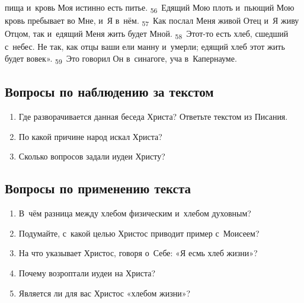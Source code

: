 \documentclass[a4paper,12pt]{article}
\begin{document}
пища и~кровь Моя истинно есть питье. \textsubscript{56}~Едящий Мою плоть и~пьющий Мою кровь пребывает во Мне, и~Я в~нём. \textsubscript{57}~Как послал Меня живой Отец и~Я живу Отцом, так и~едящий Меня жить будет Мной. \textsubscript{58}~Этот-то есть хлеб, сшедший с~небес. Не так, как отцы ваши ели манну и~умерли; едящий хлеб этот жить будет вовек». \textsubscript{59}~Это говорил Он в~синагоге, уча в~Капернауме. 

\subsection*{Вопросы по наблюдению за текстом}
\begin{enumerate}
    \item Где разворачивается данная беседа Христа? Ответьте текстом из Писания. 
    
    \myline
    
    \myline
    \item По какой причине народ искал Христа? 
    
    \myline
    
    \myline
    \item Сколько вопросов задали иудеи Христу? 
    
    \myline
    
    \myline
\end{enumerate}

\subsection*{Вопросы по применению текста} 
\begin{enumerate}
    \item В~чём разница между хлебом физическим и~хлебом духовным? 
    
    \myline
    
    \myline
    \item Подумайте, с~какой целью Христос приводит пример с~Моисеем? 
    
    \myline
    
    \myline
    \item На что указывает Христос, говоря о~Себе: «Я есмь хлеб жизни»? 
    
    \myline
    
    \myline
    \item Почему возроптали иудеи на Христа? 
    
    \myline
    
    \myline
    \item Является ли для вас Христос «хлебом жизни»?
    
    \myline
    
    \myline
\end{enumerate}
\end{document}
